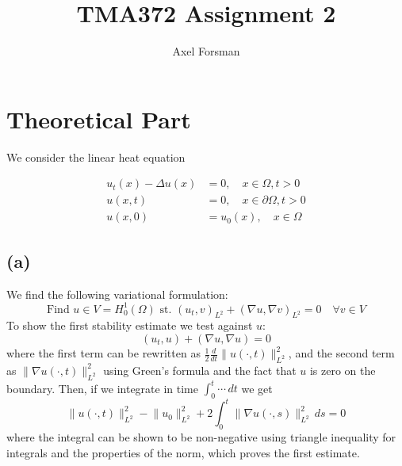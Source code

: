 \documentclass{article}
\author{Axel Forsman}
\title{TMA372 Assignment 2}
\begin{document}
\maketitle

\section{Theoretical Part}

We consider the linear heat equation

\begin{align*}
  u_t(x) - \Delta u(x) &= 0, \quad x \in \Omega, t > 0 \\
  u(x, t) &= 0, \quad x \in \partial\Omega, t > 0 \\
  u(x, 0) &= u_0(x), \quad x \in \Omega
\end{align*}

\subsection{(a)}

We find the following variational formulation:
\begin{equation*}
  \text{Find $u \in V = H_0^1(\Omega)$ st. } (u_t, v)_{L^2} + (\nabla u, \nabla v)_{L^2} = 0
  \quad \forall v \in V \tag{VF}
\end{equation*}
To show the first stability estimate we test against $u$:
$$ (u_t, u) + (\nabla u, \nabla u) = 0 $$
where the first term can be rewritten as $\frac12 \frac d{dt} \lVert u(\cdot, t) \rVert_{L^2}^2$,
and the second term as $\lVert \nabla u(\cdot, t) \rVert_{L^2}^2$
using Green's formula and the fact that $u$ is zero on the boundary.
Then, if we integrate in time $\int_0^t \cdots \, dt$ we get
$$ \lVert u(\cdot, t) \rVert_{L^2}^2 - \lVert u_0 \rVert_{L^2}^2 + 2 \int_0^t \lVert \nabla u(\cdot, s) \rVert_{L^2}^2 \, ds = 0 $$
where the integral can be shown to be non-negative using
triangle inequality for integrals and the properties of the norm,
which proves the first estimate.
\end{document}
